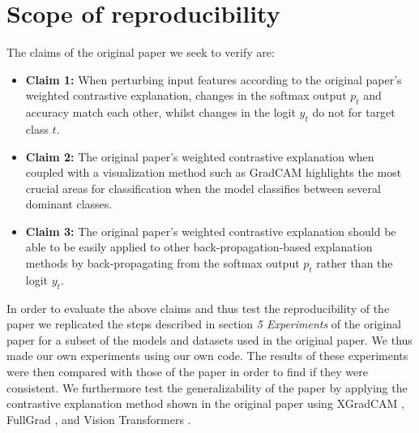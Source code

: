 \section{Scope of reproducibility}







\label{Contributions}
The claims of the original paper we seek to verify are:
\begin{itemize}
    \item \textbf{Claim 1:} When perturbing input features according to the original paper's weighted contrastive explanation, changes in the softmax output $p_t$ and accuracy match each other, whilst changes in the logit $y_t$ do not for target class $t$.
    \label{claim1}
    \label{claim2}
    \item \textbf{Claim 2:} The original paper's weighted contrastive explanation when coupled with a visualization method such as GradCAM highlights the most crucial areas for classification when the model classifies between several dominant classes.
    \label{claim3}
    \item \textbf{Claim 3:} The original paper's weighted contrastive explanation should be able to be easily applied to other back-propagation-based explanation methods by back-propagating from the softmax output $p_t$ rather than the logit $y_t$.
\end{itemize}

In order to evaluate the above claims and thus test the reproducibility of the paper we replicated the steps described in section \textit{5 Experiments} of the original paper for a subset of the models and datasets used in the original paper. We thus made our own experiments using our own code. The results of these experiments were then compared with those of the paper in order to find if they were consistent. We furthermore test the generalizability of the paper by applying the contrastive explanation method shown in the original paper using XGradCAM \citep{xgradcam}, FullGrad \citep{srinivasFullgradientRepresentationNeural2019}, and Vision Transformers \citep{visual-transformer}.



